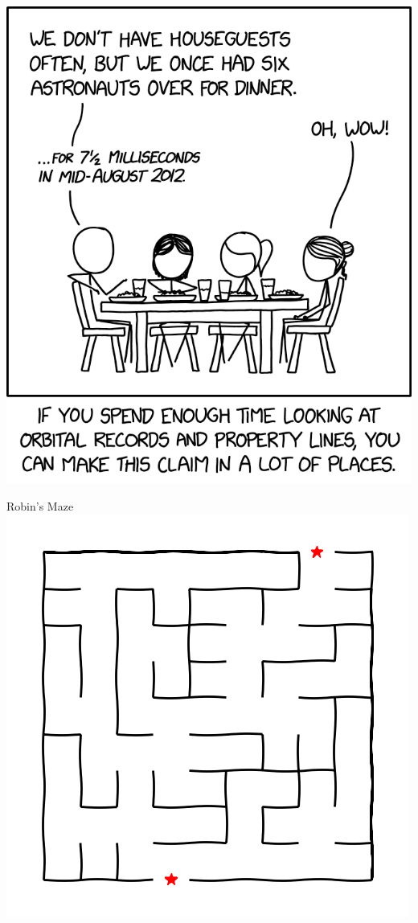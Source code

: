 \documentclass{article}
\begin{document}
\begin{multicols}{3}
\center\includegraphics[width=\linewidth]{images/comic.png}
\closearticle


\vspace{-0.5cm}

Robin's Maze\vspace{-0.5cm}
\center\includegraphics[width=\linewidth]{images/maze_r.png}


\end{multicols}
\end{document}
